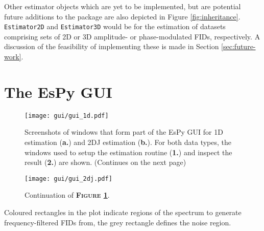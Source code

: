 Other estimator objects which are yet to be implemented, but are potential
future additions to the package are also depicted in Figure
\ref{fig:inheritance}. \texttt{Estimator2D} and \texttt{Estimator3D} would be
for the estimation of datasets comprising sets of \ac{2D} or \ac{3D} amplitude-
or phase-modulated \acp{FID}, respectively. A discussion of the feasibility of
implementing these is made in Section \ref{sec:future-work}.

\section{The \acs{EsPy} \acs{GUI}}
\begin{figure}
    \centering
    \texttt{[image: gui/gui\_1d.pdf]}
    \caption[
        Screenshots of the \acs{EsPy} \acs{GUI} for \ac{1D} and \acs{2DJ} estimation.
    ]{
        Screenshots of windows that form part of the \ac{EsPy} \ac{GUI} for
        \ac{1D} estimation (\textbf{a.}) and \ac{2DJ} estimation (\textbf{b.}).
        For both data types, the windows used to setup the estimation routine
        (\textbf{1.}) and inspect the result (\textbf{2.}) are shown.
        (Continues on the next page)
    }
    \label{fig:gui}
\end{figure}
\begin{figure}%
    \ContinuedFloat
    \centering
    \texttt{[image: gui/gui\_2dj.pdf]}
    \caption*{Continuation of \textbf{\textsc{Figure \ref{fig:gui}}}.}
\end{figure}
 Coloured rectangles in the plot indicate regions of the spectrum to generate
 frequency-filtered \acp{FID} from, the grey rectangle defines the noise
 region.
